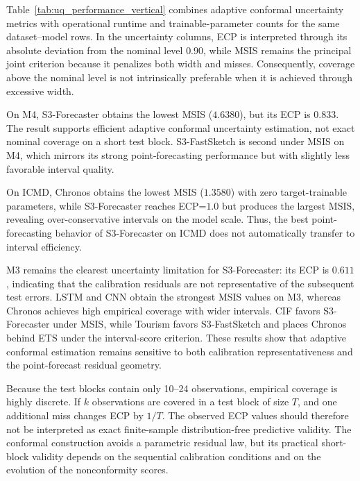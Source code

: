 Table~\ref{tab:uq_performance_vertical} combines adaptive conformal uncertainty metrics with operational runtime and trainable-parameter counts for the same dataset--model rows. In the uncertainty columns, ECP is interpreted through its absolute deviation from the nominal level $0.90$, while MSIS remains the principal joint criterion because it penalizes both width and misses.
Consequently, coverage above the nominal level is not intrinsically preferable
when it is achieved through excessive width.

On M4, S3-Forecaster obtains the lowest MSIS ($4.6380$), but its ECP is
$0.833$. The result supports efficient adaptive conformal uncertainty
estimation, not exact nominal coverage on a short test block. S3-FastSketch is
second under MSIS on M4, which mirrors its strong point-forecasting performance
but with slightly less favorable interval quality.

On ICMD, Chronos obtains the lowest MSIS ($1.3580$) with zero target-trainable
parameters, while S3-Forecaster reaches ECP=$1.0$ but produces the largest MSIS,
revealing over-conservative intervals on the model scale. Thus, the best
point-forecasting behavior of S3-Forecaster on ICMD does not automatically
transfer to interval efficiency.

M3 remains the clearest uncertainty limitation for S3-Forecaster: its ECP is
$0.611$, indicating that the calibration residuals are not representative of
the subsequent test errors. LSTM and CNN obtain the strongest MSIS values on M3,
whereas Chronos achieves high empirical coverage with wider intervals. CIF
favors S3-Forecaster under MSIS, while Tourism favors S3-FastSketch and places
Chronos behind ETS under the interval-score criterion. These results show that
adaptive conformal estimation remains sensitive to both calibration
representativeness and the point-forecast residual geometry.

Because the test blocks contain only 10--24 observations, empirical coverage is
highly discrete. If $k$ observations are covered in a test block of size $T$,
and one additional miss changes ECP by $1/T$. The observed ECP values should
therefore not be interpreted as exact finite-sample
distribution-free predictive validity. The conformal construction avoids a
parametric residual law, but its practical short-block validity depends on the
sequential calibration conditions and on the evolution of the nonconformity
scores.



